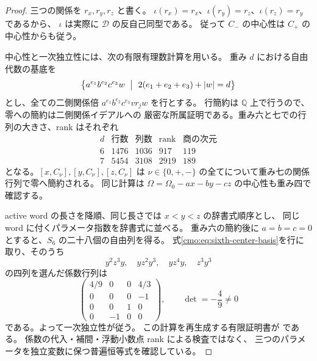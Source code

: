 \begin{proof}
三つの関係を $r_x,r_y,r_z$ と書く。
$\iota(r_x)=r_x$、$\iota(r_y)=r_z$、$\iota(r_z)=r_y$ であるから、
$\iota$ は実際に $\mathcal D$ の反自己同型である。
従って $C_-$ の中心性は $C_+$ の中心性からも従う。

中心性と一次独立性には、次の有限有理数計算を用いる。
重み $d$ における自由代数の基底を
\[
 \bigl\{a^{e_1}b^{e_2}c^{e_3}w\ \bigm|\
       2(e_1+e_2+e_3)+|w|=d\bigr\}
\]
とし、全ての二側関係倍
$a^{e_1}b^{e_2}c^{e_3}v r_j w$ を行とする。
行簡約は $\mathbb Q$ 上で行うので、零への簡約は二側関係イデアルへの
厳密な所属証明である。重み六と七での行列の大きさ、rank はそれぞれ
\[
\begin{array}{c|r|r|r|r}
 d&\text{行数}&\text{列数}&\text{rank}&\text{商の次元}\\ \hline
 6&1476&1036&917&119\\
 7&5454&3108&2919&189
\end{array}
\]
となる。$[x,C_\nu],[y,C_\nu],[z,C_\nu]$ は
$\nu\in\{0,+,-\}$ の全てについて重み七の関係行列で零へ簡約される。
同じ計算は
$\Omega=\Omega_0-ax-by-cz$ の中心性も重み四で確認する。

active word の長さを降順、同じ長さでは $x<y<z$ の辞書式順序とし、
同じ word に付くパラメータ指数を辞書式に並べる。
重み六の簡約後に $a=b=c=0$ とすると、$S_6$ の二十八個の自由列を得る。
式\eqref{cmo:eq:sixth-center-basis}を行に取り、そのうち
\[
 y^2z^3y,\quad yz^2y^3,\quad yz^4y,\quad z^3y^3
\]
の四列を選んだ係数行列は
\begin{equation}\label{cmo:eq:sixth-center-minor}
 \begin{pmatrix}
  4/9&0&0&4/3\\
  0&0&0&-1\\
  0&0&1&0\\
  0&-1&0&0
 \end{pmatrix},\qquad \det=-\frac49\ne0
\end{equation}
である。よって一次独立性が従う。
この計算を再生成する有限証明書が
 である。
係数の代入・補間・浮動小数点 rank による検査ではなく、
三つのパラメータを独立変数に保つ普遍恒等式を確認している。
\end{proof}

